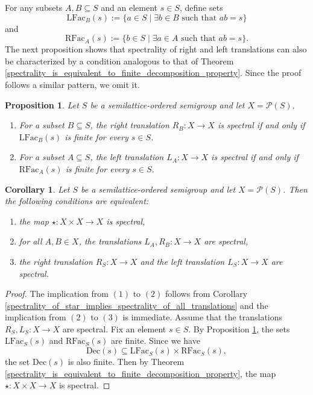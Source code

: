 \documentclass[10pt, reqno]{amsart}
\theoremstyle{plain}
\newtheorem{prop}[theorem]{Proposition}
\newtheorem{corollary}[theorem]{Corollary}
\theoremstyle{definition}
\begin{document}
For any subsets $A, B \subseteq S$ and an element $s \in S$, define sets $$\mathrm{LFac}_B(s) := \{a \in S \mid \exists b\in B\text{ such that } ab = s\}$$ and $$\mathrm{RFac}_A(s) := \{b \in S \mid \exists a\in A\text{ such that } ab = s\}.$$
The next proposition shows that spectrality of right and left translations can also be characterized by a condition analogous to that of Theorem \ref{spectrality_is_equivalent_to_finite_decomposition_property}. Since the proof follows a similar pattern, we omit it. 
\begin{prop}\label{spectrality_of_translations_are_equivalent_to_finitness_of_proper_factorizations_sets}
    Let $S$ be a semilattice-ordered semigroup and let $X = \mathcal{P}(S)$. 
    \begin{enumerate}[label=(\arabic*)]
        \item For a subset $B \subseteq S$, the right translation $R_B: X \to X$ is spectral if and only if $\mathrm{LFac}_B(s)$ is finite for every $s\in S$. 
        \item For a subset $A \subseteq S$, the left translation $L_A: X \to X$ is spectral if and only if $\mathrm{RFac}_A(s)$ is finite for every $s \in S$. 
    \end{enumerate}
\end{prop}
\begin{corollary}\label{spectrality_of_star_is_equivalent_to_spectrality_of_all_left_and_right_translations}
    Let $S$ be a semilattice-ordered semigroup and let $X = \mathcal{P}(S)$. Then the following conditions are equivalent: 
    \begin{enumerate}[label=(\arabic*)]
        \item the map $\star: X \times X \to X$ is spectral,
        \item for all $A, B \in X$, the translations $L_A, R_B: X \to X$ are spectral, 
        \item the right translation $R_S: X \to X$ and the left translation $L_S: X \to X$ are spectral. 
    \end{enumerate}
\end{corollary}
\begin{proof}
    The implication from $(1)$ to $(2)$ follows from Corollary \ref{spectrality_of_star_implies_spectrality_of_all_translations} and the implication from $(2)$ to $(3)$ is immediate. Assume that the translations $R_S, L_S: X\to X$ are spectral. Fix an element $s \in S$. By Proposition \ref{spectrality_of_translations_are_equivalent_to_finitness_of_proper_factorizations_sets}, the sets $\mathrm{LFac}_S(s)$ and $\mathrm{RFac}_S(s)$ are finite. Since we have $$\mathrm{Dec}(s) \subseteq \mathrm{LFac}_S(s)\times\mathrm{RFac}_S(s),$$ the set $\mathrm{Dec}(s)$ is also finite. Then by Theorem \ref{spectrality_is_equivalent_to_finite_decomposition_property}, the map $\star: X \times X \to X$ is spectral. 
\end{proof}
\end{document}
